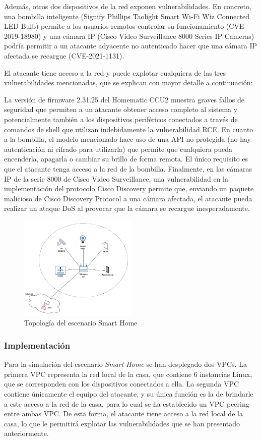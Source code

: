   Además, otros dos dispositivos de la red exponen vulnerabilidades. En concreto, una bombilla inteligente (Signify Phillips Taolight Smart Wi-Fi Wiz Connected LED Bulb) permite a los usuarios remotos controlar su funcionamiento (CVE-2019-18980) y una cámara IP (Cisco Video Surveillance 8000 Series IP Cameras) podría permitir a un atacante adyacente no autenticado hacer que una cámara IP afectada se recargue (CVE-2021-1131). 

  El atacante tiene acceso a la red y puede explotar cualquiera de las tres vulnerabilidades mencionadas, que se explican con mayor detalle a continuación:

  La versión de firmware 2.31.25 del Homematic CCU2 muestra graves fallos de seguridad que permiten a un atacante obtener acceso completo al sistema y potencialmente también a los dispositivos periféricos conectados a través de comandos de shell que utilizan indebidamente la vulnerabilidad RCE. En cuanto a la bombilla, el modelo mencionado hace uso de una API no protegida (no hay autenticación ni cifrado para utilizarla) que permite que cualquiera pueda encenderla, apagarla o cambiar su brillo de forma remota. El único requisito es que el atacante tenga acceso a la red de la bombilla. Finalmente, en las cámaras IP de la serie 8000 de Cisco Video Surveillance, una vulnerabilidad en la implementación del protocolo Cisco Discovery permite que, enviando un paquete malicioso de Cisco Discovery Protocol a una cámara afectada, el atacante pueda realizar un ataque DoS al provocar que la cámara se recargue inesperadamente. 

  \begin{figure}[h]
  \centering
  \includegraphics[width=0.5\textwidth]{../imgs/desarrollo/escenarios-de-red/smart-home/smart-home.png}
  \caption{Topología del escenario Smart Home}
  \label{fig:sh-t}
  \end{figure}

\subsubsection{Implementación}
  Para la simulación del escenario \textit{Smart Home} se han desplegado dos VPCs. La primera VPC representa la red local de la casa, que contiene 6 instancias Linux, que se corresponden con los dispositivos conectados a ella. La segunda VPC contiene únicamente el equipo del atacante, y su única función es la de brindarle a este acceso a la red de la casa, para lo cual se ha establecido un VPC peering entre ambas VPC. De esta forma, el atacante tiene acceso a la red local de la casa, lo que le permitirá explotar las vulnerabilidades que se han presentado anteriormente.

